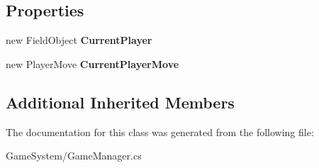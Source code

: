 \subsection*{Properties}
\begin{DoxyCompactItemize}
\item 
new Field\+Object {\bfseries Current\+Player}\hypertarget{classhoppin_1_1_game_system_1_1_game_manager_1_1_new_game_state_af880e531df0442bffb92172d258f550e}{}\label{classhoppin_1_1_game_system_1_1_game_manager_1_1_new_game_state_af880e531df0442bffb92172d258f550e}

\item 
new Player\+Move {\bfseries Current\+Player\+Move}\hypertarget{classhoppin_1_1_game_system_1_1_game_manager_1_1_new_game_state_a062a24bf1136d2ca6876daeaabc48bef}{}\label{classhoppin_1_1_game_system_1_1_game_manager_1_1_new_game_state_a062a24bf1136d2ca6876daeaabc48bef}

\end{DoxyCompactItemize}
\subsection*{Additional Inherited Members}


The documentation for this class was generated from the following file\+:\begin{DoxyCompactItemize}
\item 
Game\+System/Game\+Manager.\+cs\end{DoxyCompactItemize}
